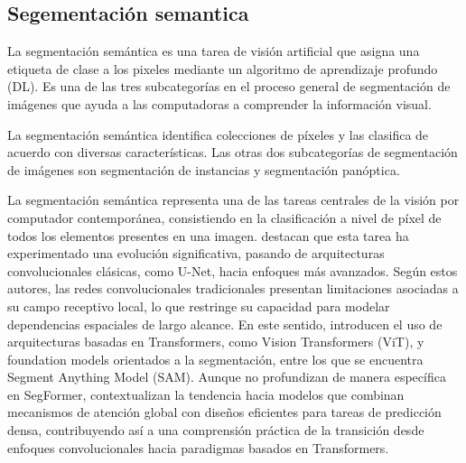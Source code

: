 
\subsection{Segementación semantica}
 La segmentación semántica es una tarea de visión artificial que asigna una etiqueta de clase a los pixeles mediante un algoritmo de aprendizaje profundo (DL). Es una de las tres subcategorías en el proceso general de segmentación de imágenes que ayuda a las computadoras a comprender la información visual.
 
 La segmentación semántica identifica colecciones de píxeles y las clasifica de acuerdo con diversas características. Las otras dos subcategorías de segmentación de imágenes son segmentación de instancias y segmentación panóptica. \cite{IBM2026}
 
 
 La segmentación semántica representa una de las tareas centrales de la visión por computador contemporánea, consistiendo en la clasificación a nivel de píxel de todos los elementos presentes en una imagen. \cite{ayyadevara2024modern} destacan que esta tarea ha experimentado una evolución significativa, pasando de arquitecturas convolucionales clásicas, como U-Net, hacia enfoques más avanzados. Según estos autores, las redes convolucionales tradicionales presentan limitaciones asociadas a su campo receptivo local, lo que restringe su capacidad para modelar dependencias espaciales de largo alcance. En este sentido, \cite{ayyadevara2024modern} introducen el uso de arquitecturas basadas en Transformers, como Vision Transformers (ViT), y foundation models orientados a la segmentación, entre los que se encuentra Segment Anything Model (SAM). Aunque no profundizan de manera específica en SegFormer, contextualizan la tendencia hacia modelos que combinan mecanismos de atención global con diseños eficientes para tareas de predicción densa, contribuyendo así a una comprensión práctica de la transición desde enfoques convolucionales hacia paradigmas basados en Transformers.

